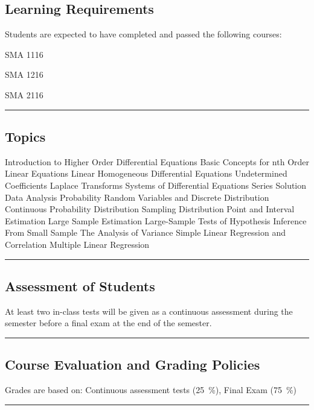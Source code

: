 \subsection*{Learning Requirements}
Students are expected to have completed and passed the following courses:
\begin{outline}
    \1      SMA 1116

    \1      SMA 1216

    \1      SMA 2116

\end{outline}
\vspace{2ex}\hrule\vspace{2ex}


\subsection*{Topics}
\begin{outline}
    \1 Introduction to Higher Order Differential Equations
    \1 Basic Concepts for nth Order Linear Equations
    \1 Linear Homogeneous Differential Equations
    \1 Undetermined Coefficients
    \1 Laplace Transforms
    \1 Systems of Differential Equations
    \1 Series Solution
    \1 Data Analysis
    \1 Probability
    \1 Random Variables and Discrete Distribution
    \1 Continuous Probability Distribution
    \1 Sampling Distribution
    \1 Point and Interval Estimation
    \1 Large Sample Estimation
    \1 Large-Sample Tests of Hypothesis
    \1 Inference From Small Sample
    \1 The Analysis of Variance
    \1 Simple Linear Regression and Correlation
    \1 Multiple Linear Regression
\end{outline}
\vspace{2ex} \hrule\vspace{2ex}

\subsection*{Assessment of Students}
At least two in-class tests will be given as a continuous assessment during the semester before a final exam at the end of the semester.
\vspace{2ex}\hrule\vspace{2ex}

\subsection*{Course Evaluation and Grading Policies}
Grades are based on:
Continuous assessment tests (\qty{25}{\percent}),
Final Exam (\qty{75}{\percent})
\vspace{2ex}\hrule\vspace{2ex}

